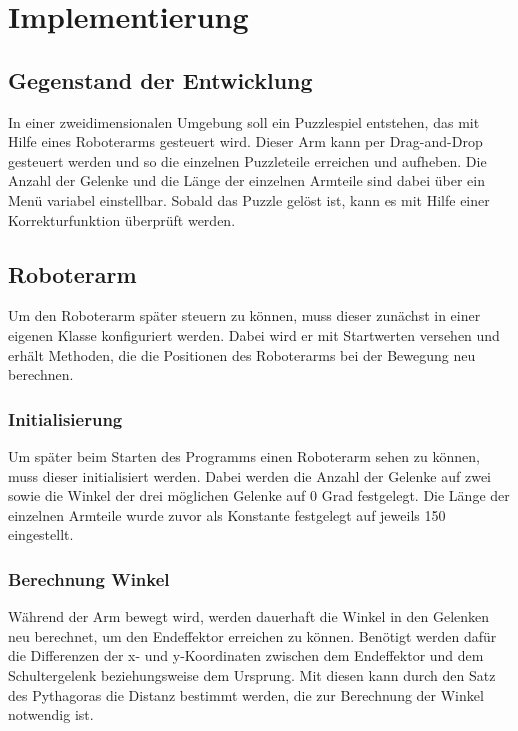 \documentclass[12pt]{article}
\begin{document}
    \section{Implementierung}
        \subsection{Gegenstand der Entwicklung}
            In einer zweidimensionalen Umgebung soll ein Puzzlespiel entstehen, das mit Hilfe eines Roboterarms
            gesteuert wird. Dieser Arm kann per Drag-and-Drop gesteuert werden und so die einzelnen Puzzleteile
            erreichen und aufheben. Die Anzahl der Gelenke und die Länge der einzelnen Armteile sind dabei über
            ein Menü variabel einstellbar. Sobald das Puzzle gelöst ist, kann es mit Hilfe einer Korrekturfunktion
            überprüft werden.

        \subsection{Roboterarm}
            Um den Roboterarm später steuern zu können, muss dieser zunächst in einer eigenen Klasse konfiguriert
            werden. Dabei wird er mit Startwerten versehen und erhält Methoden, die die Positionen des Roboterarms
            bei der Bewegung neu berechnen.

            \subsubsection{Initialisierung}
                Um später beim Starten des Programms einen Roboterarm sehen zu können, muss dieser initialisiert
                werden. Dabei werden die Anzahl der Gelenke auf zwei sowie die Winkel der drei möglichen Gelenke
                auf 0 Grad festgelegt. Die Länge der einzelnen Armteile wurde zuvor als Konstante festgelegt auf
                jeweils 150 eingestellt.

            \subsubsection{Berechnung Winkel}
                Während der Arm bewegt wird, werden dauerhaft die Winkel in den Gelenken neu berechnet, um den
                Endeffektor erreichen zu können. Benötigt werden dafür die Differenzen der x- und y-Koordinaten
                zwischen dem Endeffektor und dem Schultergelenk beziehungsweise dem Ursprung. Mit diesen kann durch
                den Satz des Pythagoras die Distanz bestimmt werden, die zur Berechnung der Winkel notwendig ist.
\end{document}
